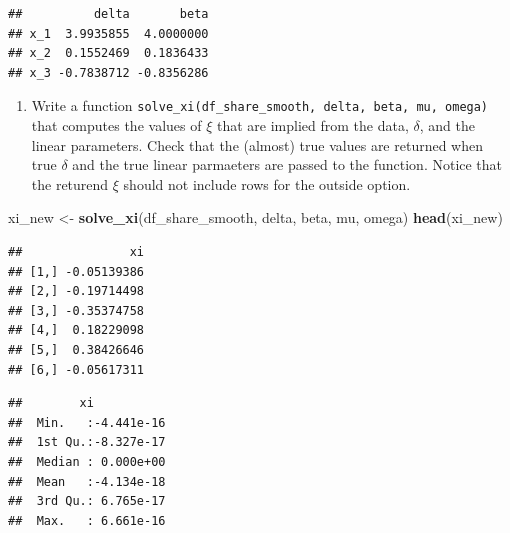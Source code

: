 \documentclass[]{book}
\newenvironment{Shaded}{\begin{snugshade}}{\end{snugshade}}
\newcommand{\KeywordTok}[1]{\textcolor[rgb]{0.13,0.29,0.53}{\textbf{#1}}}
\newcommand{\DecValTok}[1]{\textcolor[rgb]{0.00,0.00,0.81}{#1}}
\newcommand{\StringTok}[1]{\textcolor[rgb]{0.31,0.60,0.02}{#1}}
\newcommand{\OperatorTok}[1]{\textcolor[rgb]{0.81,0.36,0.00}{\textbf{#1}}}
\newcommand{\NormalTok}[1]{#1}
\providecommand{\tightlist}{%
  \setlength{\itemsep}{0pt}\setlength{\parskip}{0pt}}
\begin{document}
\begin{verbatim}
##          delta       beta
## x_1  3.9935855  4.0000000
## x_2  0.1552469  0.1836433
## x_3 -0.7838712 -0.8356286
\end{verbatim}

\begin{enumerate}
\def\labelenumi{\arabic{enumi}.}
\setcounter{enumi}{10}
\tightlist
\item
  Write a function
  \texttt{solve\_xi(df\_share\_smooth,\ delta,\ beta,\ mu,\ omega)} that
  computes the values of \(\xi\) that are implied from the data,
  \(\delta\), and the linear parameters. Check that the (almost) true
  values are returned when true \(\delta\) and the true linear
  parmaeters are passed to the function. Notice that the returend
  \(\xi\) should not include rows for the outside option.
\end{enumerate}

\begin{Shaded}
\begin{Highlighting}[]
\NormalTok{xi_new <-}\StringTok{ }\KeywordTok{solve_xi}\NormalTok{(df_share_smooth, delta, beta, mu, omega)}
\KeywordTok{head}\NormalTok{(xi_new)}
\end{Highlighting}
\end{Shaded}

\begin{verbatim}
##               xi
## [1,] -0.05139386
## [2,] -0.19714498
## [3,] -0.35374758
## [4,]  0.18229098
## [5,]  0.38426646
## [6,] -0.05617311
\end{verbatim}

\begin{Shaded}
\end{Shaded}

\begin{verbatim}
##        xi            
##  Min.   :-4.441e-16  
##  1st Qu.:-8.327e-17  
##  Median : 0.000e+00  
##  Mean   :-4.134e-18  
##  3rd Qu.: 6.765e-17  
##  Max.   : 6.661e-16
\end{verbatim}
\end{document}
